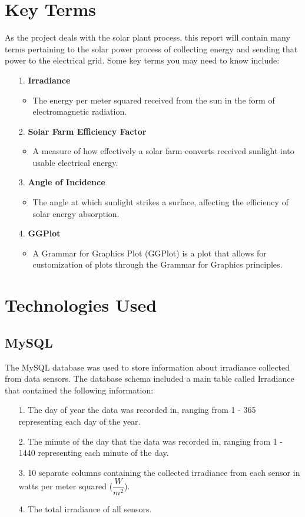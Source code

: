 \documentclass{sigchi}
\begin{document}
\section{Key Terms}
As the project deals with the solar plant process, this report will contain many terms pertaining to the solar power process of collecting energy and sending that power to the electrical grid. Some key terms you may need to know include:
\begin{itemize}
    \item[1.] \textbf{Irradiance}
    \begin{itemize}
        \item The energy per meter squared received from the sun in the form of electromagnetic radiation.
    \end{itemize}
    \item[2.] \textbf{Solar Farm Efficiency Factor}
    \begin{itemize}
        \item A measure of how effectively a solar farm converts received sunlight into usable electrical energy.
    \end{itemize}
    \item[3.] \textbf{Angle of Incidence}
    \begin{itemize}
        \item The angle at which sunlight strikes a surface, affecting the efficiency of solar energy absorption.
    \end{itemize}
    \item[4.] \textbf{GGPlot}
    \begin{itemize}
        \item A Grammar for Graphics Plot (GGPlot) is a plot that allows for customization of plots through the Grammar for Graphics principles.
    \end{itemize}
\end{itemize}
\section{Technologies Used}

\subsection{MySQL}
The MySQL database was used to store information about irradiance collected from data sensors. The database schema included a main table called Irradiance that contained the following information:
\begin{itemize}
\item[1.] The day of year the data was recorded in, ranging from 1 - 365 representing each day of the year.
\item[2.] The minute of the day that the data was recorded in, ranging from 1 - 1440 representing each minute of the day.
\item[3.] 10 separate columns containing the collected irradiance from each sensor in watts per meter squared ($\dfrac{W}{m^2}$). 
\item[4.] The total irradiance of all sensors.
\end{itemize}
\end{document}
